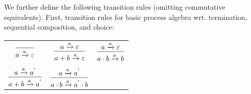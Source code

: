 \documentclass[99-notes-packed.tex]{subfiles}
\begin{document}
We further define the following transition rules (omitting commutative equivalents). First, transition rules for basic process algebra wrt. termination, sequential composition, and choice:
\begin{center}
    \begin{tabular}{ccc}
        $
        \begin{prooftree}
            \infer0{a \xrightarrow{a} \varepsilon}
        \end{prooftree}
        $   &
        $
        \begin{prooftree}
            \hypo{a \xrightarrow{a} \varepsilon}
            \infer1{a + b \xrightarrow{a} \varepsilon}
        \end{prooftree}
        $   &
        $
        \begin{prooftree}
            \hypo{a \xrightarrow{a} \varepsilon}
            \infer1{a \cdot b \xrightarrow{a} b}
        \end{prooftree}
        $   \\
        \\
        $
        \begin{prooftree}
            \hypo{a \xrightarrow{a} a^{'}}
            \infer1{a + b \xrightarrow{a} a^{'}}
        \end{prooftree}
        $   &
        $
        \begin{prooftree}
            \hypo{a \xrightarrow{a} a^{'}}
            \infer1{a \cdot b \xrightarrow{a} a^{'} \cdot b}
        \end{prooftree}
        $   &
            \\
    \end{tabular}
\end{center}
\end{document}
